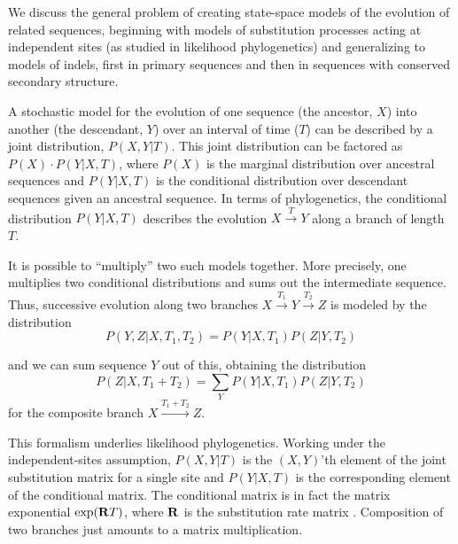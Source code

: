 \documentclass[10pt]{article}
\begin{document}
We discuss the general problem of creating state-space models of the
evolution of related sequences, beginning with models of substitution processes acting at independent
sites (as studied in likelihood phylogenetics) and generalizing to models of
indels, first in primary sequences and then in sequences with
conserved secondary structure.

A stochastic model for the evolution of one sequence (the ancestor, $X$) into
another (the descendant, $Y$) over an interval of time ($T$) can be described by a
joint distribution, $P (X, Y | T)$.
This joint distribution can be factored as $P (X) \cdot P (Y | X, T)$, 
where $P(X)$ is the marginal distribution over ancestral sequences
and $P(Y | X, T)$ is the conditional distribution over descendant sequences given an ancestral sequence.
In terms of phylogenetics, the conditional distribution $P(Y | X, T)$ describes the evolution $X \stackrel{T}{\to} Y$
along a branch of length $T$.

It is possible to ``multiply'' two such models together.
More precisely, one multiplies two conditional distributions and sums out the intermediate sequence.
Thus, successive evolution along two branches $X \stackrel{T_1}{\to} Y \stackrel{T_2}{\to} Z$
is modeled by the distribution
\[
P(Y,Z|X,T_1,T_2) = P(Y | X, T_1) P(Z | Y, T_2)
\]

and we can sum sequence $Y$ out of this, obtaining the distribution
\[
P(Z|X,T_1+T_2) = \sum_Y P(Y | X, T_1) P(Z | Y, T_2)
\]
for the composite branch
$X \stackrel{T_1 + T_2}{\longrightarrow} Z$.

This formalism underlies likelihood phylogenetics.
Working under the independent-sites assumption, $P (X, Y | T)$ is the $(X,Y)$'th element of the joint substitution matrix for a single site
and $P(Y | X, T)$ is the corresponding element of the conditional matrix.
The conditional matrix is in fact the matrix exponential
 $\exp({\bf R}T)$, where ${\bf R}$ is the substitution rate matrix \cite{HolmesRubin2002b}.
Composition of two branches just amounts to a matrix multiplication.
\end{document}

